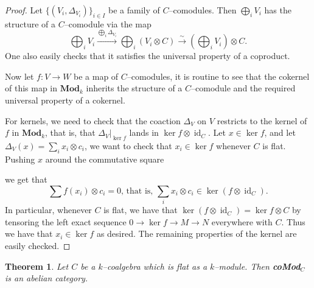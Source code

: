 \documentclass{article}
\theoremstyle{plain}
\newtheorem{Th}{Theorem}[section]
\theoremstyle{definition}
\DeclareMathOperator{\id}{id}
\begin{document}
\begin{proof}
    Let $\{(V_i, \Delta_{V_i}) \}_{i\in I}$ be a family of $C$--comodules. Then $\bigoplus_i V_i$ has the structure of a $C$--comodule via the map 
    \[
    \bigoplus_i V_i  \xrightarrow{\bigoplus_i \Delta_{V_i}}\bigoplus_i\left(V_i\otimes C\right) \xrightarrow{\sim} \left(\bigoplus_i V_i\right) \otimes C.
    \]
    One also easily checks that it satisfies the universal property of a coproduct. 
    
    Now let $f\colon V\to W$ be a map of $C$--comodules, it is routine to see that the cokernel of this map in $\textbf{Mod}_k$ inherits the structure of a $C$--comodule and the required universal property of a cokernel. 
    
    For kernels, we need to check that the coaction $\Delta_V$ on $V$ restricts to the kernel of $f$ in ${\textbf{{Mod}}}_k$, that is, that $\Delta_V|_{\ker f}$ lands in $\ker f\otimes \id_C$. Let $x\in \ker f$, and let $\Delta_V(x)=\sum_i x_i \otimes c_i$, we want to check that $x_i\in \ker f$ whenever $C$ is flat. Pushing $x$ around the commutative square
       \begin{center}
    \end{center}
    we get that  
    \[
    \sum f(x_i)\otimes c_i=0 \mbox{, that is, } \sum_i x_i\otimes c_i\in \ker(f\otimes \id_C). 
    \]
     In particular, whenever $C$ is flat, we have that $\ker(f\otimes \id_C)= \ker f\otimes C$ by tensoring the left exact sequence $0\to\ker f\to M\to N$ everywhere with $C$. Thus we have that $x_i\in \ker f$ as desired. The remaining properties of the kernel are easily checked.
\end{proof}


\begin{Th}\label{abelian}
    Let $C$ be a $k$--coalgebra which is flat as a $k$--module. Then \emph{\textbf{coMod}}$_C$ is an abelian category. 
\end{Th}
\end{document}
